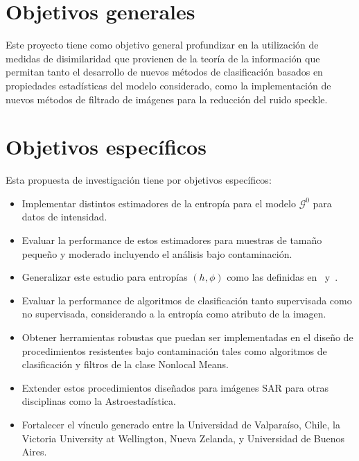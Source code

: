 \documentclass[12pt]{article}
\begin{document}
%

\section{Objetivos generales}



Este proyecto tiene como objetivo general profundizar en la utilización de medidas de disimilaridad que provienen de la teoría de la información que permitan tanto el desarrollo de nuevos métodos de clasificación basados en propiedades estadísticas del modelo considerado, como la implementación de nuevos métodos de filtrado de imágenes para la reducción del ruido speckle.

\section{Objetivos específicos}

Esta propuesta de investigación tiene por objetivos específicos:
\begin{itemize}
	\item Implementar distintos estimadores de la entropía para el modelo $\mathcal{G}^0$ para datos de intensidad.
	\item Evaluar la performance de estos estimadores para muestras de tamaño pequeño y moderado incluyendo el análisis bajo contaminación.
	\item Generalizar este estudio para entropías $(h,\phi)$ como las definidas en~\cite{Menendez1997} y~\cite{Salicru1994}. 
	\item Evaluar la performance de algoritmos de clasificación tanto supervisada como no supervisada, considerando a la entropía como atributo de la imagen.
	\item Obtener herramientas robustas que puedan ser implementadas en el diseño de procedimientos resistentes bajo contaminación tales como algoritmos de clasificación y filtros de la clase Nonlocal Means.
	\item Extender estos procedimientos diseñados para imágenes SAR para otras disciplinas como la Astroestadística.
	\item Fortalecer el vínculo generado entre la Universidad de Valparaíso, Chile, la Victoria University at Wellington, Nueva Zelanda, y Universidad de Buenos Aires.
\end{itemize}
\end{document}
